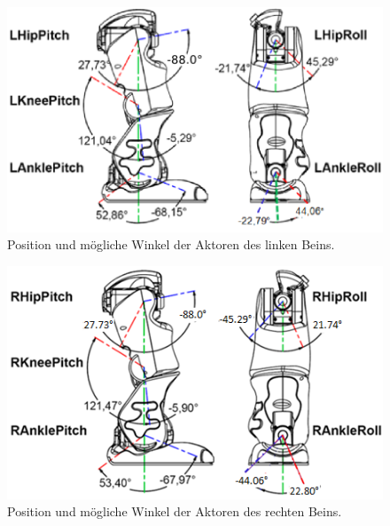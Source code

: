 
\begin{figure}[htb]
	\centering
	\includegraphics[width=0.7\linewidth]{Bilder/hardware_llegjoint.png}
	\caption{Position und mögliche Winkel der Aktoren des linken Beins.}
	\label{hardware_llegjoint}
\end{figure}
\begin{figure}[htb]
	\centering
	\includegraphics[width=0.7\linewidth]{Bilder/hardware_rlegjoint.png}
	\caption{Position und mögliche Winkel der Aktoren des rechten Beins.}
	\label{hardware_rlegjoint}
\end{figure}

